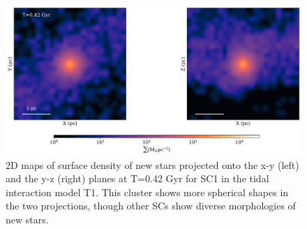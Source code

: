 \documentclass[fleqn,usenatbib]{mnras}
\begin{document}
\begin{figure}
 \centering
 \includegraphics[width=15cm]{6..png}
 \caption{2D maps of surface density of new stars projected onto the x-y (left) and the y-z (right) planes at T=0.42 Gyr for SC1 in the tidal interaction model T1. This cluster shows more spherical shapes in the two projections, though other SCs show diverse morphologies of new stars.}
 \label{fig:6Cluster}
\end{figure}
\end{document}
